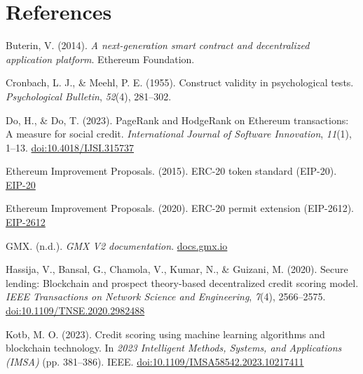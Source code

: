 \clearpage
\chapter*{References}
\label{ch:references}

\hangindent=0.5in  Buterin, V. (2014). \textit{A next-generation smart contract and decentralized application platform}. Ethereum Foundation.\par

\hangindent=0.5in  Cronbach, L. J., \& Meehl, P. E. (1955). Construct validity in psychological tests. \textit{Psychological Bulletin}, \textit{52}(4), 281--302.\par

\hangindent=0.5in  Do, H., \& Do, T. (2023). PageRank and HodgeRank on Ethereum transactions: A measure for social credit. \textit{International Journal of Software Innovation}, \textit{11}(1), 1--13. \href{https://doi.org/10.4018/IJSI.315737}{doi:10.4018/IJSI.315737}\par

\hangindent=0.5in  Ethereum Improvement Proposals. (2015). ERC-20 token standard (EIP-20). \href{https://eips.ethereum.org/EIPS/eip-20}{EIP-20}\par

\hangindent=0.5in  Ethereum Improvement Proposals. (2020). ERC-20 permit extension (EIP-2612). \href{https://eips.ethereum.org/EIPS/eip-2612}{EIP-2612}\par

\hangindent=0.5in  GMX. (n.d.). \textit{GMX V2 documentation}. \href{https://docs.gmx.io/}{docs.gmx.io}\par

\hangindent=0.5in  Hassija, V., Bansal, G., Chamola, V., Kumar, N., \& Guizani, M. (2020). Secure lending: Blockchain and prospect theory-based decentralized credit scoring model. \textit{IEEE Transactions on Network Science and Engineering}, \textit{7}(4), 2566--2575. \href{https://doi.org/10.1109/TNSE.2020.2982488}{doi:10.1109/TNSE.2020.2982488}\par

\hangindent=0.5in  Kotb, M. O. (2023). Credit scoring using machine learning algorithms and blockchain technology. In \textit{2023 Intelligent Methods, Systems, and Applications (IMSA)} (pp. 381--386). IEEE. \href{https://doi.org/10.1109/IMSA58542.2023.10217411}{doi:10.1109/IMSA58542.2023.10217411}\par

